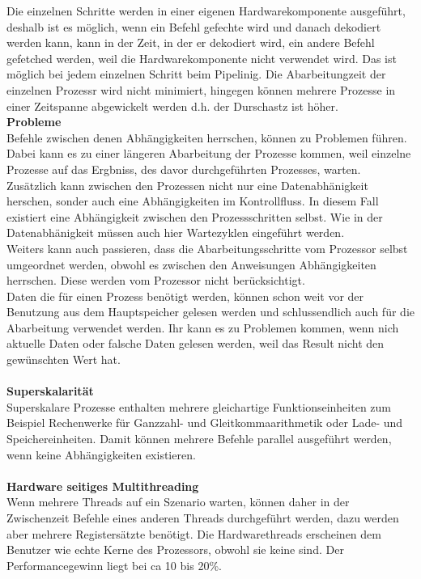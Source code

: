 \documentclass[a4paper,12pt]{article}
\begin{document}
Die einzelnen Schritte werden in einer eigenen Hardwarekomponente ausgeführt, deshalb ist es möglich, wenn ein Befehl gefechte wird und danach dekodiert werden kann, kann in der Zeit, in der er dekodiert wird, ein andere Befehl gefetched werden, weil die Hardwarekomponente nicht verwendet wird. Das ist möglich bei jedem einzelnen Schritt beim Pipelinig. Die Abarbeitungzeit der einzelnen Prozessr wird nicht minimiert, hingegen können mehrere Prozesse in einer Zeitspanne abgewickelt werden d.h. der Durschastz ist höher.\\
\textbf{Probleme\\}
Befehle zwischen denen Abhängigkeiten herrschen, können zu Problemen führen. Dabei kann es zu einer längeren Abarbeitung der Prozesse kommen, weil einzelne Prozesse auf das Ergbniss, des davor durchgeführten Prozesses, warten.\\ Zusätzlich kann zwischen den Prozessen nicht nur eine Datenabhänigkeit herschen, sonder auch eine Abhängigkeiten im Kontrollfluss. In diesem Fall existiert eine Abhängigkeit zwischen den Prozessschritten selbst. Wie in der Datenabhänigkeit müssen auch hier Wartezyklen eingeführt werden.\\
Weiters kann auch passieren, dass die Abarbeitungsschritte vom Prozessor selbst umgeordnet werden, obwohl es zwischen den Anweisungen Abhängigkeiten herrschen. Diese werden vom Prozessor nicht berücksichtigt.\\
Daten die für einen Prozess benötigt werden, können schon weit vor der Benutzung aus dem Hauptspeicher gelesen werden und schlussendlich auch für die Abarbeitung verwendet werden. Ihr kann es zu Problemen kommen, wenn nich aktuelle Daten oder falsche Daten gelesen werden, weil das Result nicht den gewünschten Wert hat.\\\\
\textbf{Superskalarität\\}
Superskalare Prozesse enthalten mehrere gleichartige Funktionseinheiten zum Beispiel Rechenwerke für Ganzzahl- und Gleitkommaarithmetik oder Lade- und Speichereinheiten. Damit können mehrere Befehle parallel ausgeführt werden, wenn keine Abhängigkeiten existieren.\\\\
\textbf{Hardware seitiges Multithreading\\}
Wenn mehrere Threads auf ein Szenario warten, können daher in der Zwischenzeit Befehle eines anderen Threads durchgeführt werden, dazu werden aber mehrere Registersätzte benötigt.
Die Hardwarethreads erscheinen dem Benutzer wie echte Kerne des Prozessors, obwohl sie keine sind. Der Performancegewinn liegt bei ca 10 bis 20\%.\\\\
\end{document}
